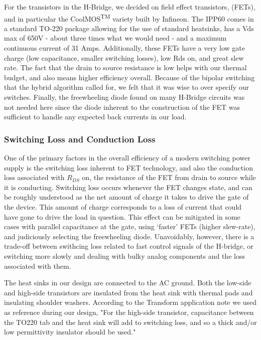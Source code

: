 For the transistors in the H-Bridge, we decided on field effect transistors, (FETs), and in particular the CoolMOS\textsuperscript{TM}
variety built by Infineon. The IPP60 comes in a standard TO-220 package allowing for the use of standard heatsinks, has a Vds max of 650V - about three times what we would need - and a maximum continuous current of 31 Amps. Additionally, these FETs have a very low gate charge (low capacitance, smaller switching losses), low Rds on, and great slew rate. The fact that the drain to source resistance is low helps with our thermal budget, and also means higher efficiency overall. Because of the bipolar switching that the hybrid algorithm called for, we felt that it was wise to over specify our switches. Finally, the freewheeling diode found on many H-Bridge circuits was not needed here since the diode inherent to the construction of the FET was sufficient to handle any expected back currents in our load. 

\subsubsection{Switching Loss and Conduction Loss}
One of the primary factors in the overall efficiency of a modern switching power supply is the switching loss inherent to FET technology, and also the conduction loss associated with $R_{DS}$ on, the resistance of the FET from drain to source while it is conducting. Switching loss occurs whenever the FET changes state, and can be roughly understood as the net amount of charge it takes to drive the gate of the device. This amount of charge corresponds to a loss of current that could have gone to drive the load in question. This effect can be mitigated in some cases with parallel capacitance at the gate, using `faster' FETs (higher slew-rate), and judiciously selecting the freewheeling diode\cite{switchingLoss}. Unavoidably, however, there is a trade-off between swithcing loss related to fast control signals of the H-bridge, or switching more slowly and dealing with bulky analog components and the loss associated with them. 

The heat sinks in our design are connected to the AC ground. Both the low-side and high-side transistors are insulated from the heat sink with thermal pads and insulating shoulder washers. According to the Transform application note we used as reference during our design, "For the high-side transistor, capacitance between the TO220 tab and the heat sink will add to switching loss, and so a thick and/or low permittivity insulator should be used."\cite{transphorm}

